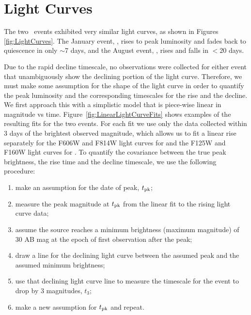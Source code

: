 \section{Light Curves}\label{sec:LightCurves}

The two \spock\ events exhibited very similar light curves, as shown
in Figures \ref{fig:LightCurves}.  The January event, \spockone, rises
to peak luminosity and fades back to quiescence in only $\sim$7 days,
and the August event, \spocktwo, rises and falls in $<20$ days.
  
  
Due to the rapid decline timescale, no observations were collected for
either event that unambiguously show the declining portion of the
light curve. Therefore, we must make some assumption for the shape of
the light curve in order to quantify the peak luminosity and the
corresponding timescales for the rise and the decline.  We first
approach this with a simplistic model that is piece-wise linear in
magnitude vs time.  Figure~\ref{fig:LinearLightCurveFits} shows
examples of the resulting fits for the two events.  For each fit we
use only the data collected within 3 days of the brightest observed
magnitude, which allows us to fit a linear rise separately for the
F606W and F814W light curves for \spockone and the F125W and F160W
light curves for \spocktwo. To quantify the covariance between the
true peak brightness, the rise time and the decline timescale, we use
the following procedure:

\begin{enumerate}
\item make an assumption for the date of peak, $t_{\rm pk}$;
\item measure the peak magnitude at $t_{\rm pk}$ from the linear fit
  to the rising light curve data;
\item assume the source reaches a minimum brightness (maximum
  magnitude) of 30 AB mag at the epoch of first observation after the
  peak;
\item draw a line for the declining light curve between the assumed
  peak and the assumed minimum brightness;
\item use that declining light curve line to measure the timescale for
  the event to drop by 3 magnitudes, $t_3$;
\item make a new assumption for $t_{\rm pk}$ and repeat.
\end{enumerate}

